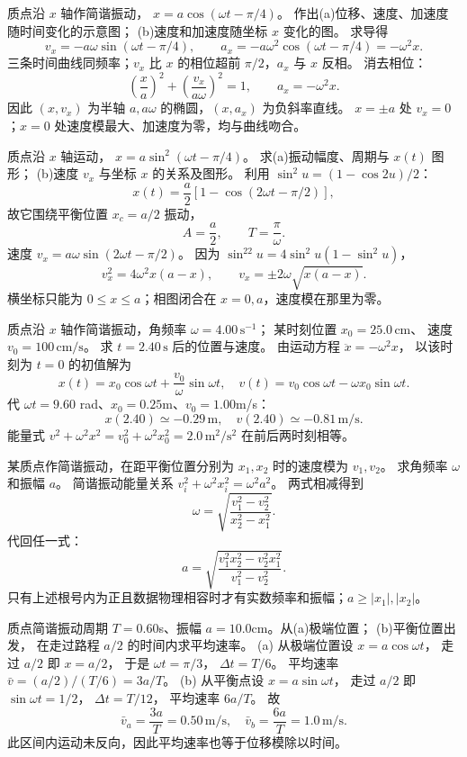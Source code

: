质点沿 $x$ 轴作简谐振动，
$x=a\cos(\omega t-\pi/4)$。
作出(a)位移、速度、加速度随时间变化的示意图；
(b)速度和加速度随坐标 $x$ 变化的图。
\exsolution
求导得
\[
v_x=-a\omega\sin(\omega t-\pi/4),\qquad
a_x=-a\omega^2\cos(\omega t-\pi/4)=-\omega^2x.
\]
三条时间曲线同频率；$v_x$ 比 $x$ 的相位超前 $\pi/2$，$a_x$ 与 $x$ 反相。
消去相位：
\[
\boxed{\left(\frac{x}{a}\right)^2+
\left(\frac{v_x}{a\omega}\right)^2=1},
\qquad
\boxed{a_x=-\omega^2x}.
\]
因此 $(x,v_x)$ 为半轴 $a,a\omega$ 的椭圆，$(x,a_x)$ 为负斜率直线。
\excheck $x=\pm a$ 处 $v_x=0$；$x=0$ 处速度模最大、加速度为零，均与曲线吻合。

质点沿 $x$ 轴运动，
$x=a\sin^2(\omega t-\pi/4)$。
求(a)振动幅度、周期与 $x(t)$ 图形；
(b)速度 $v_x$ 与坐标 $x$ 的关系及图形。
\exsolution
利用 $\sin^2u=(1-\cos2u)/2$：
\[
x(t)=\frac a2\left[1-\cos(2\omega t-\pi/2)\right],
\]
故它围绕平衡位置 $x_c=a/2$ 振动，
\[
\boxed{A=\frac a2,\qquad T=\frac\pi\omega}.
\]
速度
$v_x=a\omega\sin(2\omega t-\pi/2)$。
因为
$\sin^22u=4\sin^2u(1-\sin^2u)$，
\[
\boxed{v_x^2=4\omega^2x(a-x)},\qquad
\boxed{v_x=\pm2\omega\sqrt{x(a-x)}}.
\]
\excheck 横坐标只能为 $0\le x\le a$；相图闭合在 $x=0,a$，速度模在那里为零。

质点沿 $x$ 轴作简谐振动，角频率
$\omega=4.00\,\mathrm{s^{-1}}$；
某时刻位置 $x_0=25.0\,\mathrm{cm}$、
速度 $v_0=100\,\mathrm{cm/s}$。
求 $t=2.40\,\mathrm s$ 后的位置与速度。
\exsolution
由运动方程 $\ddot x=-\omega^2x$，
以该时刻为 $t=0$ 的初值解为
\[
x(t)=x_0\cos\omega t+\frac{v_0}{\omega}\sin\omega t,
\quad
v(t)=v_0\cos\omega t-\omega x_0\sin\omega t.
\]
代 $\omega t=9.60$ rad、$x_0=0.25$m、$v_0=1.00$m/s：
\[
\boxed{x(2.40)\simeq-0.29\,\mathrm m},\quad
\boxed{v(2.40)\simeq-0.81\,\mathrm{m/s}}.
\]
\excheck 能量式
$v^2+\omega^2x^2=v_0^2+\omega^2x_0^2=2.0\,\mathrm{m^2/s^2}$
在前后两时刻相等。

某质点作简谐振动，在距平衡位置分别为
$x_1,x_2$ 时的速度模为 $v_1,v_2$。
求角频率 $\omega$ 和振幅 $a$。
\exsolution
简谐振动能量关系
$v_i^2+\omega^2x_i^2=\omega^2a^2$。
两式相减得到
\[
\boxed{\omega=
\sqrt{\frac{v_1^2-v_2^2}{x_2^2-x_1^2}}}.
\]
代回任一式：
\[
\boxed{a=
\sqrt{\frac{v_1^2x_2^2-v_2^2x_1^2}
{v_1^2-v_2^2}}}.
\]
\excheck 只有上述根号内为正且数据物理相容时才有实数频率和振幅；$a\ge|x_1|,|x_2|$。

质点简谐振动周期 $T=0.60$s、振幅
$a=10.0$cm。从(a)极端位置；
(b)平衡位置出发，
在走过路程 $a/2$ 的时间内求平均速率。
\exsolution
(a) 从极端位置设 $x=a\cos\omega t$，
走过 $a/2$ 即 $x=a/2$，
于是 $\omega t=\pi/3$，
$\Delta t=T/6$。
平均速率
$\bar v=(a/2)/(T/6)=3a/T$。
(b) 从平衡点设 $x=a\sin\omega t$，
走过 $a/2$ 即 $\sin\omega t=1/2$，
$\Delta t=T/12$，
平均速率 $6a/T$。
故
\[
\boxed{\bar v_a=\frac{3a}{T}=0.50\,\mathrm{m/s}},
\quad
\boxed{\bar v_b=\frac{6a}{T}=1.0\,\mathrm{m/s}}.
\]
\excheck 此区间内运动未反向，因此平均速率也等于位移模除以时间。

